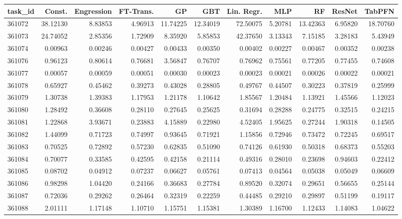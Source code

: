 \begin{tabular}{lrrrrrrrrrr}
\toprule
task\_id & Const. & Engression & FT-Trans. & GP & GBT & Lin. Regr. & MLP & RF & ResNet & TabPFN \\
\midrule
361072 & 38.12130 & 8.83853 & 4.96913 & 11.74225 & 12.34019 & 72.50075 & 5.20781 & 13.42363 & 6.95820 & 18.70760 \\
361073 & 24.74052 & 2.85356 & 1.72909 & 8.35920 & 5.85853 & 42.37650 & 3.13343 & 7.15185 & 3.28183 & 5.43949 \\
361074 & 0.00963 & 0.00246 & 0.00427 & 0.00433 & 0.00350 & 0.00402 & 0.00227 & 0.00467 & 0.00352 & 0.00238 \\
361076 & 0.96123 & 0.80614 & 0.76681 & 3.56847 & 0.76707 & 0.76962 & 0.75561 & 0.77205 & 0.77455 & 0.74608 \\
361077 & 0.00057 & 0.00059 & 0.00051 & 0.00030 & 0.00023 & 0.00023 & 0.00021 & 0.00026 & 0.00022 & 0.00021 \\
361078 & 0.65927 & 0.45462 & 0.39273 & 0.43028 & 0.28805 & 0.49767 & 0.44507 & 0.30223 & 0.37819 & 0.25999 \\
361079 & 1.30738 & 1.39383 & 1.17953 & 1.21178 & 1.10642 & 1.85567 & 1.20484 & 1.13921 & 1.45566 & 1.12023 \\
361080 & 1.28492 & 0.36608 & 0.28110 & 0.27645 & 0.25625 & 0.31694 & 0.28288 & 0.24775 & 0.32515 & 0.24215 \\
361081 & 1.22868 & 3.93671 & 0.23883 & 4.15889 & 0.22980 & 4.52405 & 1.95625 & 0.27244 & 1.90318 & 0.14505 \\
361082 & 1.44099 & 0.71723 & 0.74997 & 0.93645 & 0.71921 & 1.15856 & 0.72946 & 0.73472 & 0.72245 & 0.69517 \\
361083 & 0.70525 & 0.72892 & 0.57230 & 0.62835 & 0.51090 & 0.74126 & 0.61930 & 0.50318 & 0.68373 & 0.55203 \\
361084 & 0.70077 & 0.33585 & 0.42595 & 0.42158 & 0.21114 & 0.49316 & 0.28010 & 0.23698 & 0.94603 & 0.22412 \\
361085 & 0.08702 & 0.04912 & 0.07237 & 0.06627 & 0.05761 & 0.07413 & 0.04564 & 0.05038 & 0.05049 & 0.06609 \\
361086 & 0.98298 & 1.04420 & 0.24166 & 0.36683 & 0.27784 & 0.89520 & 0.32074 & 0.29651 & 0.56655 & 0.25144 \\
361087 & 0.72036 & 0.29262 & 0.26464 & 0.32319 & 0.22259 & 0.44485 & 0.29210 & 0.29897 & 0.51199 & 0.19117 \\
361088 & 2.01111 & 1.17148 & 1.10710 & 1.15751 & 1.15381 & 1.30389 & 1.16700 & 1.12433 & 1.14083 & 1.04622 \\

\end{tabular}
